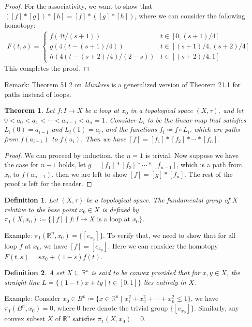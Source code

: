 \documentclass[11pt]{book}
\theoremstyle{break}
\theoremstyle{break}
\newtheorem{thm}{Theorem}[section]
\newtheorem{defn}{Definition}[corL]
\newcommand{\R}{\mathbb{R}}
\newcommand{\remark}{\color{blue}Remark: \color{black}}
\newcommand{\example}{\color{green}Example: \color{black}}
\begin{document}
\begin{proof}
For the associativity, we want to show that $([f]*[g])*[h] = [f]*([g]*[h])$, where we can consider the following homotopy:
\begin{align*}
F(t,s) = \begin{cases}
f(4t/(s+1)) & t\in [0,(s+1)/4]\\
g(4(t-(s+1)/4)) & t \in [(s+1)/4, (s+2)/4]\\
h( 4 (t-(s+2)/4)/(2-s) ) & t \in [(s+2)/4 , 1]
\end{cases}
\end{align*}
This completes the proof. 
\end{proof}

\remark Theorem 51.2 on \textit{Munkres} is a generalized version of Theorem 21.1 for paths instead of loops. 

\begin{thm}
Let $f:I \to X$ be a loop at $x_0$ in a topological space $(X,\tau)$, and let $0 < a_0 < a_1<\cdots<a_{n-1}<a_n = 1$. Consider $L_i$ to be the linear map that satisfies $L_i(0) =a_{i-1}$ and $L_i(1) = a_i$, and the functions $f_i \coloneqq f\circ L_i$, which are paths from $f(a_{i-1})$ to $f(a_i)$. Then we have $[f] = [f_1]*[f_2]*\cdots*[f_n]$. 
\end{thm}
\begin{proof}
We can proceed by induction, the $n=1$ is trivial. Now suppose we have the case for $n-1$ holds, let $g = [f_1]*[f_2]*\cdots*[f_{n-1}]$, which is a path from $x_0$ to $f(a_{n-1})$, then we are left to show $[f] = [g]*[f_n]$. The rest of the proof is left for the reader. 
\end{proof}

\begin{defn}
Let $(X,\tau)$ be a topological space. The fundamental group of $X$ relative to the base point $x_0 \in X$ is defined by $\pi_1(X,x_0) \coloneqq \{[f]\mid f:I \to X\text{ is a loop at }x_0\}$. 
\end{defn}

\example $\pi_1(\R^n , x_0) = \{[e_{x_0}]\}$. To verify that, we need to show that for all loop $f$ at $x_0$, we have $[f] = [e_{x_0}]$. Here we can consider the homotopy $F(t,s) = sx_0 + (1-s) f(t)$.

\begin{defn}
A set $X\subseteq \R^n$ is said to be convex provided that for $x,y \in X$, the straight line $L  = \{(1-t)x + ty \mid t \in [0,1]\}$ lies entirely in $X$. 
\end{defn}

\example Consider $x_0 \in B^n \coloneqq \{ x \in \R^n \mid x_1^2 + x_2^2 + \cdots +x_n^2 \leq 1\} $, we have $\pi_1(B^n, x_0) = 0$, where $0$ here denote the trivial group $\{[e_{x_0}]\}$. Similarly, any convex subset $X$ of $\R^n$ satisfies $\pi_1(X,x_0) = 0$. \\
\end{document}
